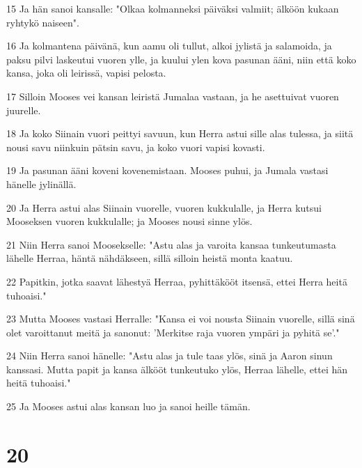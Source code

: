 \par 15 Ja hän sanoi kansalle: "Olkaa kolmanneksi päiväksi valmiit; älköön kukaan ryhtykö naiseen".
\par 16 Ja kolmantena päivänä, kun aamu oli tullut, alkoi jylistä ja salamoida, ja paksu pilvi laskeutui vuoren ylle, ja kuului ylen kova pasunan ääni, niin että koko kansa, joka oli leirissä, vapisi pelosta.
\par 17 Silloin Mooses vei kansan leiristä Jumalaa vastaan, ja he asettuivat vuoren juurelle.
\par 18 Ja koko Siinain vuori peittyi savuun, kun Herra astui sille alas tulessa, ja siitä nousi savu niinkuin pätsin savu, ja koko vuori vapisi kovasti.
\par 19 Ja pasunan ääni koveni kovenemistaan. Mooses puhui, ja Jumala vastasi hänelle jylinällä.
\par 20 Ja Herra astui alas Siinain vuorelle, vuoren kukkulalle, ja Herra kutsui Mooseksen vuoren kukkulalle; ja Mooses nousi sinne ylös.
\par 21 Niin Herra sanoi Moosekselle: "Astu alas ja varoita kansaa tunkeutumasta lähelle Herraa, häntä nähdäkseen, sillä silloin heistä monta kaatuu.
\par 22 Papitkin, jotka saavat lähestyä Herraa, pyhittäkööt itsensä, ettei Herra heitä tuhoaisi."
\par 23 Mutta Mooses vastasi Herralle: "Kansa ei voi nousta Siinain vuorelle, sillä sinä olet varoittanut meitä ja sanonut: 'Merkitse raja vuoren ympäri ja pyhitä se'."
\par 24 Niin Herra sanoi hänelle: "Astu alas ja tule taas ylös, sinä ja Aaron sinun kanssasi. Mutta papit ja kansa älkööt tunkeutuko ylös, Herraa lähelle, ettei hän heitä tuhoaisi."
\par 25 Ja Mooses astui alas kansan luo ja sanoi heille tämän.

\chapter{20}

